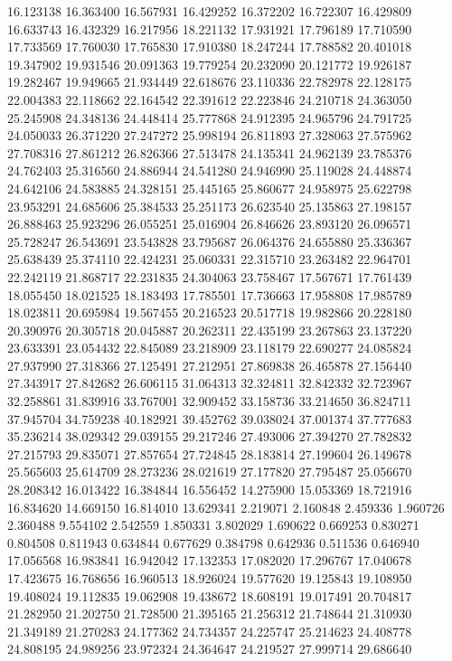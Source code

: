 16.123138
16.363400
16.567931
16.429252
16.372202
16.722307
16.429809
16.633743
16.432329
16.217956
18.221132
17.931921
17.796189
17.710590
17.733569
17.760030
17.765830
17.910380
18.247244
17.788582
20.401018
19.347902
19.931546
20.091363
19.779254
20.232090
20.121772
19.926187
19.282467
19.949665
21.934449
22.618676
23.110336
22.782978
22.128175
22.004383
22.118662
22.164542
22.391612
22.223846
24.210718
24.363050
25.245908
24.348136
24.448414
25.777868
24.912395
24.965796
24.791725
24.050033
26.371220
27.247272
25.998194
26.811893
27.328063
27.575962
27.708316
27.861212
26.826366
27.513478
24.135341
24.962139
23.785376
24.762403
25.316560
24.886944
24.541280
24.946990
25.119028
24.448874
24.642106
24.583885
24.328151
25.445165
25.860677
24.958975
25.622798
23.953291
24.685606
25.384533
25.251173
26.623540
25.135863
27.198157
26.888463
25.923296
26.055251
25.016904
26.846626
23.893120
26.096571
25.728247
26.543691
23.543828
23.795687
26.064376
24.655880
25.336367
25.638439
25.374110
22.424231
25.060331
22.315710
23.263482
22.964701
22.242119
21.868717
22.231835
24.304063
23.758467
17.567671
17.761439
18.055450
18.021525
18.183493
17.785501
17.736663
17.958808
17.985789
18.023811
20.695984
19.567455
20.216523
20.517718
19.982866
20.228180
20.390976
20.305718
20.045887
20.262311
22.435199
23.267863
23.137220
23.633391
23.054432
22.845089
23.218909
23.118179
22.690277
24.085824
27.937990
27.318366
27.125491
27.212951
27.869838
26.465878
27.156440
27.343917
27.842682
26.606115
31.064313
32.324811
32.842332
32.723967
32.258861
31.839916
33.767001
32.909452
33.158736
33.214650
36.824711
37.945704
34.759238
40.182921
39.452762
39.038024
37.001374
37.777683
35.236214
38.029342
29.039155
29.217246
27.493006
27.394270
27.782832
27.215793
29.835071
27.857654
27.724845
28.183814
27.199604
26.149678
25.565603
25.614709
28.273236
28.021619
27.177820
27.795487
25.056670
28.208342
16.013422
16.384844
16.556452
14.275900
15.053369
18.721916
16.834620
14.669150
16.814010
13.629341
2.219071
2.160848
2.459336
1.960726
2.360488
9.554102
2.542559
1.850331
3.802029
1.690622
0.669253
0.830271
0.804508
0.811943
0.634844
0.677629
0.384798
0.642936
0.511536
0.646940
17.056568
16.983841
16.942042
17.132353
17.082020
17.296767
17.040678
17.423675
16.768656
16.960513
18.926024
19.577620
19.125843
19.108950
19.408024
19.112835
19.062908
19.438672
18.608191
19.017491
20.704817
21.282950
21.202750
21.728500
21.395165
21.256312
21.748644
21.310930
21.349189
21.270283
24.177362
24.734357
24.225747
25.214623
24.408778
24.808195
24.989256
23.972324
24.364647
24.219527
27.999714
29.686640
